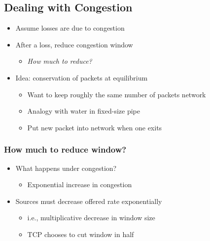 \subsection{Dealing with Congestion}
\begin{itemize}[nosep]
    \item Assume losses are due to congestion
    \item After a loss, reduce congestion window
          \begin{itemize}[nosep]
              \item \emph{How much to reduce?}
          \end{itemize}
    \item Idea: conservation of packets at equilibrium
          \begin{itemize}[nosep]
              \item Want to keep roughly the same number of packets network
              \item Analogy with water in fixed-size pipe
              \item Put new packet into network when one exits
          \end{itemize}
\end{itemize}

\subsubsection{How much to reduce window?}
\begin{itemize}[nosep]
    \item What happens under congestion?
          \begin{itemize}[nosep]
              \item Exponential increase in congestion
          \end{itemize}
    \item Sources must decrease offered rate exponentially
          \begin{itemize}[nosep]
              \item i.e., multiplicative decrease in window size
              \item TCP chooses to cut window in half
          \end{itemize}
\end{itemize}

